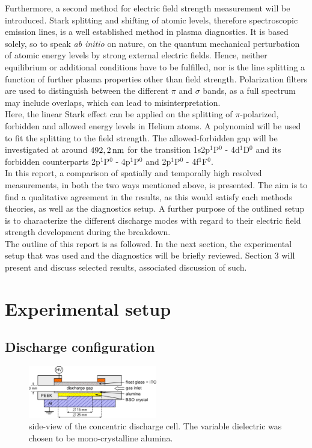 \documentclass[a4paper,10pt,twoside]{article}
\newcommand{\tilt}[1]{\textit{#1}}
\begin{document}
		Furthermore, a second method for electric field \linebreak strength measurement will be introduced. Stark splitting and shifting of atomic levels, therefore spectroscopic emission lines, is a well established method in plasma diagnostics. It is based solely, so to speak \tilt{ab initio} on nature, on the quantum mechanical perturbation of atomic energy levels by strong external electric fields. Hence, neither equilibrium or additional conditions have to be fulfilled, nor is the line splitting a function of further plasma properties other than field strength. Polarization filters are used to distinguish between the different $\pi$ and $\sigma$ bands, as a full spectrum may include overlaps, which can lead to misinterpretation.\\
		Here, the linear Stark effect can be applied on the splitting of $\pi$-polarized, forbidden and allowed energy levels in Helium atoms. A polynomial will be used to fit the splitting to the field strength. The allowed-forbidden gap will be investigated at around $\unit[492,2]{nm}$ for the transition 1s2p$^1$P$^0$ - 4d$^1$D$^0$ and its forbidden counterparts 2p$^1$P$^0$ - 4p$^1$P$^0$ and 2p$^1$P$^0$ - 4f$^1$F$^0$.\\
		In this report, a comparison of spatially and temporally high resolved measurements, in both the two ways mentioned above, is presented. The aim is to find a qualitative agreement in the results, as this would satisfy each methods theories, as well as the diagnostics setup. A further purpose of the outlined setup is to characterize the different discharge modes with regard to their electric field strength development during the breakdown.\\
		The outline of this report is as followed. In the next section, the experimental setup that was used and the diagnostics will be briefly reviewed. Section 3 will present and discuss selected results, associated discussion of such.

	\section{Experimental setup}
	
		\subsection{Discharge configuration}
		
				\begin{figure}
					\centering
					\includegraphics[width=0.5\textwidth]{figures/setup/discharge_cell.pdf}
					\caption{side-view of the concentric discharge cell. The variable dielectric was chosen to be mono-crystalline alumina.}
					\label{img:cell}
				\end{figure}
		
\end{document}
